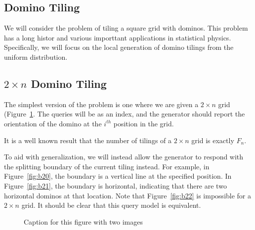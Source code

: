 \subsection{Domino Tiling}
We will consider the problem of tiling a square grid with dominos.
This problem has a long histor and various importtant applications in statistical physics.
Specifically, we will focus on the local generation of domino tilings from the uniform distribution.

\subsection{$2\times n$ Domino Tiling}
The simplest version of the problem is one where we are given a $2\times n$ grid (Figure~\ref{fig:dom2}.
The queries will be as an index, and the generator should report the orientation of the domino at the $i^{th}$ position in the grid.
\begin{figure}[htbp]
    \centering
    \caption{}
    \label{fig:dom2}
\end{figure}

It is a well known result  that the number of tilings of a $2\times n$ grid is exactly $F_n$.

To aid with generalization, we will instead allow the generator to respond with the splitting boundary of the current tiling instead.
For example, in Figure~\ref{fig:b20}, the boundary is a vertical line at the specified position.
In Figure~\ref{fig:b21}, the boundary is horizontal, indicating that there are two horizontal dominos at that location.
Note that Figure~\ref{fig:b22} is impossible for a $2\times n$ grid.
It should be clear that this query model is equivalent.

\begin{figure}[h]
    \centering
    \caption{Caption for this figure with two images}
    \label{fig:boundary2}
\end{figure}

